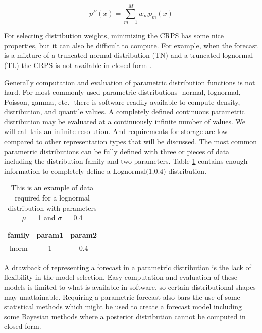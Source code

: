 \documentclass[11pt,notitlepage]{isuthesis}
\begin{document}
\begin{equation}
\label{eq:bma}
  p^E(x) = \sum_{m=1}^M w_mp_m(x)
\end{equation}


For selecting distribution weights, minimizing the CRPS has some nice 
properties, but it can also be
difficult to compute. For example, when the forecast is a mixture of a 
truncated normal distribution (TN) and a truncated lognormal (TL) the CRPS is 
not available in closed form \cite[]{baran2018combining}.

Generally computation and evaluation of parametric distribution functions is not 
hard. 
For most commonly used parametric distributions -normal, lognormal, Poisson,
gamma, etc.- there is software readily available to compute density, 
distribution, and quantile values. 
A completely defined continuous parametric distribution may be evaluated at a
continuously
infinite number of values. We will call this an infinite resolution.
And requirements for storage are low 
compared to other representation types that will be discussed. The most common
parametric distributions can be fully defined with three or pieces of data
including
the distribution family and two parameters. Table \ref{table:pstor} 
contains
enough information to completely define a $\mbox{Lognormal(1,0.4)}$ 
distribution.

\begin{table}[h!]
\begin{center}
\begin{minipage}{10cm}
\captionsetup{font=scriptsize}
\centering
 \begin{tabular}{|c c c|} 
 \hline
 family & param1 & param2 \\ [0.5ex] 
 \hline
 lnorm & 1 & 0.4 \\ 
 \hline
 \end{tabular}
 \caption[Parametric distribution storage]{This is an example of data required
 for a lognormal 
 distribution with 
 parameters $\mu = $ 1 and $\sigma =$ 0.4}
 \label{table:pstor}
 \end{minipage}
 \end{center}
\end{table}


A drawback of representing a forecast in a parametric distribution is the lack 
of flexibility in the model selection. Easy computation and evaluation of these 
models is limited to what is available in software, so certain distributional
shapes may unattainable.
Requiring a parametric forecast also bars the use of some statistical methods
which might be used to create a forecast model including some Bayesian methods
where a posterior distribution cannot be computed in closed form.
\end{document}
